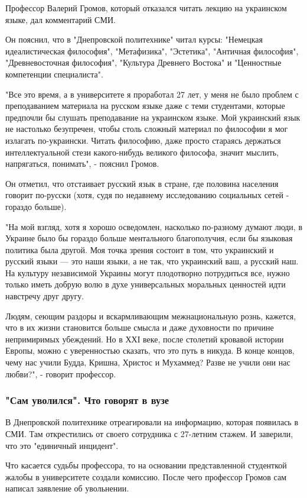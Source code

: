 Профессор Валерий Громов, который отказался читать лекцию на украинском языке,
дал комментарий СМИ. 

Он пояснил, что в "Днепровской политехнике" читал курсы: "Немецкая
идеалистическая философия", "Метафизика", "Эстетика", "Античная философия",
"Древневосточная философия", "Культура Древнего Востока" и "Ценностные
компетенции специалиста".

"Все это время, а в университете я проработал 27 лет, у меня не было проблем с
преподаванием материала на русском языке даже с теми студентами, которые
предпочли бы слушать преподавание на украинском языке. Мой украинский язык не
настолько безупречен, чтобы столь сложный материал по философии я мог излагать
по-украински. Читать философию, даже просто стараясь держаться интеллектуальной
стези какого-нибудь великого философа, значит мыслить, напрягаться, понимать",
- пояснил Громов.

Он отметил, что отстаивает русский язык в стране, где половина населения
говорит по-русски (хотя, судя по недавнему исследованию социальных сетей -
гораздо больше).

"На мой взгляд, хотя я хорошо осведомлен, насколько по-разному думают люди, в
Украине было бы гораздо больше ментального благополучия, если бы языковая
политика была другой. Моя точка зрения состоит в том, что украинский и русский
языки --- это наши языки, а не так, что украинский ваш, а русский наш. На
культуру независимой Украины могут плодотворно потрудиться все, нужно только
иметь добрую волю в духе универсальных моральных ценностей идти навстречу друг
другу.

Людям, сеющим раздоры и вскармливающим межнациональную рознь, кажется, что в их
жизни становится больше смысла и даже духовности по причине непримиримых
убеждений. Но в ХХІ веке, после столетий кровавой истории Европы, можно с
уверенностью сказать, что это путь в никуда. В конце концов, чему нас учили
Будда, Кришна, Христос и Мухаммед? Разве не учили они нас любви?", - говорит
профессор.

\subsubsection{"Сам уволился". Что говорят в вузе}

В Днепровской политехнике отреагировали на информацию, которая появилась в СМИ.
Там открестились от своего сотрудника с 27-летним стажем. И заверили, что это
"единичный инцидент". 

Что касается судьбы профессора, то на основании представленной студенткой
жалобы в университете создали комиссию. После чего профессор Громов сам написал
заявление об увольнении. 

